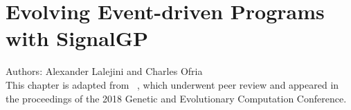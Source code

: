 \chapter{Evolving Event-driven Programs with SignalGP}



\noindent
Authors: Alexander Lalejini and Charles Ofria \\
This chapter is adapted from ~\citep{lalejini_evolving_2018}, which underwent peer review and appeared in the proceedings of the 2018 Genetic and Evolutionary Computation Conference.









